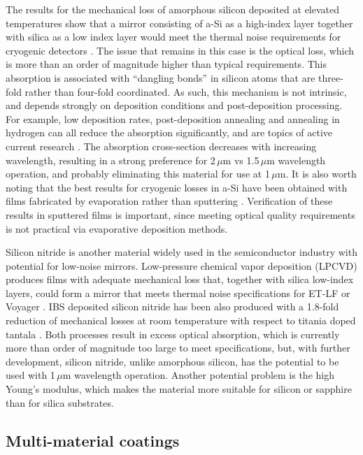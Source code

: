 \noindent The results for the mechanical loss of amorphous silicon deposited at elevated temperatures show that a mirror consisting of a-Si as a high-index layer together with silica as a low index layer would meet the thermal noise requirements for cryogenic detectors \cite{steinlechner2018silicon}. The issue that remains in this case is the optical loss, which is more than an order of magnitude higher than typical requirements. This absorption is associated with ``dangling bonds'' in silicon atoms that are three-fold rather than four-fold coordinated. As such, this mechanism is not intrinsic, and depends strongly on deposition conditions and post-deposition processing. For example, low deposition rates, post-deposition annealing and annealing in hydrogen can all reduce the absorption significantly, and are topics of active current research \cite{birney2018amorphous}. The absorption cross-section decreases with increasing wavelength, resulting in a strong preference for 2\,$\mu$m vs 1.5\,$\mu$m wavelength operation, and probably eliminating this material for use at 1\,$\mu$m. It is also worth noting that the best results for cryogenic losses in a-Si have been obtained with films fabricated by evaporation rather than sputtering \cite{liu2014hydrogen}. Verification of these results in sputtered films is important, since meeting optical quality requirements is not practical via evaporative deposition methods.

Silicon nitride is another material widely used in the semiconductor industry with potential for low-noise mirrors. Low-pressure chemical vapor deposition (LPCVD) produces films with adequate mechanical loss that, together with silica low-index layers, could form a mirror that meets thermal noise specifications for ET-LF or Voyager \cite{pan2018silicon}. IBS deposited silicon nitride has been also produced with a 1.8-fold reduction of mechanical losses at room temperature with respect to titania doped tantala \cite{pan2018silicon}. Both processes result in excess optical absorption, which is currently more than order of magnitude too large to meet specifications, but, with further development, silicon nitride, unlike amorphous silicon, has the potential to be used with 1\,$\mu$m wavelength operation. Another potential problem is the high Young's modulus, which makes the material more suitable for silicon or sapphire than for silica substrates.

\subsection{Multi-material coatings}

